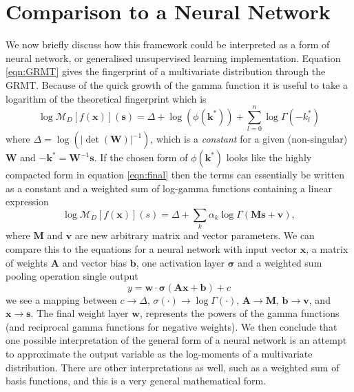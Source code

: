 \documentclass{article}
\begin{document}
\section{Comparison to a Neural Network}
We now briefly discuss how this framework could be interpreted as a form of neural network, or generalised unsupervised learning implementation. Equation \ref{eqn:GRMT} gives the fingerprint of a multivariate distribution through the GRMT. Because of the quick growth of the gamma function it is useful to take a logarithm of the theoretical fingerprint which is
\begin{equation}
\log \mathcal{M}_D[f(\mathbf{x})](\mathbf{s}) = \Delta + \log(\phi(\mathbf{k}^*)) + \sum_{l=0}^n \log\Gamma(-k_l^*)
\end{equation}
where $\Delta = \log(|\det(\mathbf{W})|^{-1})$, which is a \emph{constant} for a given (non-singular) $\mathbf{W}$ and $-\mathbf{k}^* = \mathbf{W}^{-1}\mathbf{s}$. If the chosen form of $\phi(\mathbf{k}^*)$ looks like the highly compacted form in equation \ref{eqn:final} then the terms can essentially be written as a constant and a weighted sum of log-gamma functions containing a linear expression
\begin{equation}
\log \mathcal{M}_D[f(\mathbf{x})](s) =  \Delta + \sum_k \alpha_k \log \Gamma( \mathbf{M s} + \mathbf{v}),
\end{equation}
where $\mathbf{M}$ and $\mathbf{v}$ are new arbitrary matrix and vector parameters. We can compare this to the equations for a neural network with input vector $\mathbf{x}$, a matrix of weights $\mathbf{A}$ and vector bias $\mathbf{b}$, one activation layer $\boldsymbol\sigma$ and a weighted sum pooling operation single output
\begin{equation}
y = \mathbf{w}\cdot\boldsymbol\sigma(\mathbf{Ax} + \mathbf{b}) + c
\end{equation}
we see a mapping between $c \to \Delta$, $\sigma(\cdot) \to \log\Gamma(\cdot)$, $\mathbf{A} \to \mathbf{M}$, $\mathbf{b} \to \mathbf{v}$, and $\mathbf{x} \to \mathbf{s}$. The final weight layer $\mathbf{w}$, represents the powers of the gamma functions (and reciprocal gamma functions for negative weights). We then conclude that one possible interpretation of the general form of a neural network is an attempt to approximate the output variable as the log-moments of a multivariate distribution. There are other interpretations as well, such as a weighted sum of basis functions, and this is a very general mathematical form. \\
\end{document}
